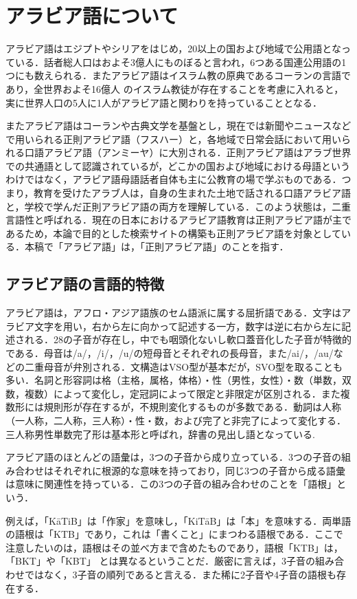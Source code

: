 \documentclass[technicalreport]{ieicej}
\begin{document}
\section{アラビア語について}
アラビア語はエジプトやシリアをはじめ，20以上の国および地域で公用語となっている．話者総人口はおよそ3億人にものぼると言われ，6つある国連公用語の1つにも数えられる．またアラビア語はイスラム教の原典であるコーランの言語であり，全世界およそ16億人 のイスラム教徒が存在することを考慮に入れると，実に世界人口の5人に1人がアラビア語と関わりを持っていることとなる．

またアラビア語はコーランや古典文学を基盤とし，現在では新聞やニュースなどで用いられる正則アラビア語（フスハー）と，各地域で日常会話において用いられる口語アラビア語（アンミーヤ）に大別される．正則アラビア語はアラブ世界での共通語として認識されているが，どこかの国および地域における母語というわけではなく，アラビア語母語話者自体も主に公教育の場で学ぶものである．つまり，教育を受けたアラブ人は，自身の生まれた土地で話される口語アラビア語と，学校で学んだ正則アラビア語の両方を理解している．このよう状態は，二重言語性と呼ばれる．現在の日本におけるアラビア語教育は正則アラビア語が主であるため，本論で目的とした検索サイトの構築も正則アラビア語を対象としている．本稿で「アラビア語」は，「正則アラビア語」のことを指す．

\subsection{アラビア語の言語的特徴}
アラビア語は，アフロ・アジア語族のセム語派に属する屈折語である．文字はアラビア文字を用い，右から左に向かって記述する一方，数字は逆に右から左に記述される．28の子音が存在し，中でも咽頭化ないし軟口蓋音化した子音が特徴的である．母音は/a/，/i/，/u/の短母音とそれぞれの長母音，また/ai/，/au/などの二重母音が弁別される．文構造はVSO型が基本だが，SVO型を取ることも多い．名詞と形容詞は格（主格，属格，体格）・性（男性，女性）・数（単数，双数，複数）によって変化し，定冠詞によって限定と非限定が区別される．また複数形には規則形が存在するが，不規則変化するものが多数である．動詞は人称（一人称，二人称，三人称）・性・数，および完了と非完了によって変化する．三人称男性単数完了形は基本形と呼ばれ，辞書の見出し語となっている.

アラビア語のほとんどの語彙は，3つの子音から成り立っている．3つの子音の組み合わせはそれぞれに根源的な意味を持っており，同じ3つの子音から成る語彙は意味に関連性を持っている．この3つの子音の組み合わせのことを「語根」という．

例えば，「KāTiB」は「作家」を意味し，「KiTāB」は「本」を意味する．両単語の語根は「KTB」であり，これは「書くこと」にまつわる語根である．ここで注意したいのは，語根はその並べ方まで含めたものであり，語根「KTB」は，「BKT」や「KBT」 とは異なるということだ．厳密に言えば，3子音の組み合わせではなく，3子音の順列であると言える．また稀に2子音や4子音の語根も存在する．
\end{document}
